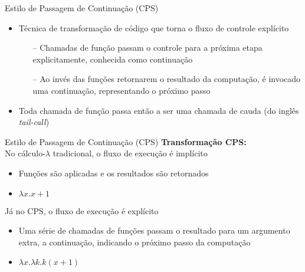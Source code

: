 \begin{frame}{Estilo de Passagem de Continuação (CPS)}
    \begin{itemize}
        \item Técnica de transformação de código que torna o fluxo de controle explícito
              \begin{itemize}
                  \item[--] Chamadas de função passam o controle para a próxima etapa explicitamente, conhecida como continuação~\cite{appel1992compiling}
                  \item[--] Ao invés das funções retornarem o resultado da computação, é invocado uma continuação, representando o próximo passo
              \end{itemize}
        \item Toda chamada de função passa então a ser uma chamada de cauda (do inglês \textit{tail-call})
    \end{itemize}
\end{frame}





\begin{frame}{Estilo de Passagem de Continuação (CPS)}
    \textbf{Transformação CPS:}\\
    No cálculo-$\lambda$ tradicional, o fluxo de execução é implícito
    \begin{itemize}
        \item Funções são aplicadas e os resultados são retornados
        \item $\lambda x. x + 1$
    \end{itemize}
    Já no CPS, o fluxo de execução é explícito
    \begin{itemize}
        \item Uma série de chamadas de funções passam o resultado para um argumento extra, a continuação, indicando o próximo passo da computação
        \item $\lambda x. \lambda k. k (x + 1)$
    \end{itemize}
\end{frame}
